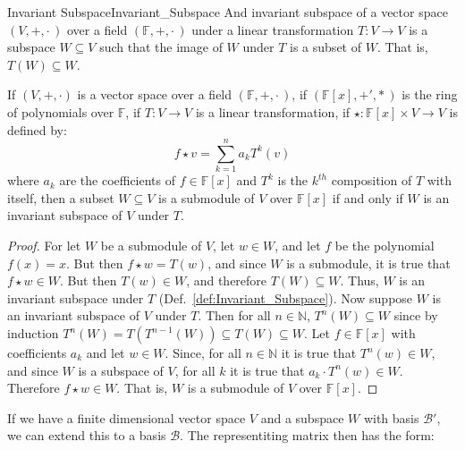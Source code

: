    \begin{fdefinition}{Invariant Subspace}{Invariant_Subspace}
        And invariant subspace of a vector space $(V,\boldsymbol{+},\cdot\,)$
        over a field $(\mathbb{F},+,\cdot\,)$ under a linear transformation
        $T:V\rightarrow{V}$ is a subspace $W\subseteq{V}$ such that the image
        of $W$ under $T$ is a subset of $W$. That is, $T(W)\subseteq{W}$.
    \end{fdefinition}
    \begin{theorem}
        If $(V,\boldsymbol{+},\boldsymbol{\cdot})$ is a vector space over a
        field $(\mathbb{F},+,\cdot\,)$, if $(\mathbb{F}[x],+',*\,)$ is
        the ring of polynomials over $\mathbb{F}$, if $T:V\rightarrow{V}$ is a
        linear transformation, if
        $\star:\mathbb{F}[x]\times{V}\rightarrow{V}$ is defined by:
        \begin{equation}
            f\star{v}=\sum_{k=1}^{n}a_{k}T^{k}(v)
        \end{equation}
        where $a_{k}$ are the coefficients of $f\in\mathbb{F}[x]$ and
        $T^{k}$ is the $k^{th}$ composition of $T$ with itself, then a subset
        $W\subseteq{V}$ is a submodule of $V$ over $\mathbb{F}[x]$ if and only
        if $W$ is an invariant subspace of $V$ under $T$.
    \end{theorem}
    \begin{proof}
        For let $W$ be a submodule of $V$, let $w\in{W}$, and let $f$ be the
        polynomial $f(x)=x$. But then $f\star{w}=T(w)$, and since $W$ is a
        submodule, it is true that $f\star{w}\in{W}$. But then $T(w)\in{W}$,
        and therefore $T(W)\subseteq{W}$. Thus, $W$ is an invariant subspace
        under $T$ (Def.~\ref{def:Invariant_Subspace}). Now suppose $W$ is an
        invariant subspace of $V$ under $T$. Then for all $n\in\mathbb{N}$,
        $T^{n}(W)\subseteq{W}$ since by induction
        $T^{n}(W)=T(T^{n-1}(W))\subseteq{T}(W)\subseteq{W}$. Let
        $f\in\mathbb{F}[x]$ with coefficients $a_{k}$ and let $w\in{W}$. Since,
        for all $n\in\mathbb{N}$ it is true that $T^{n}(w)\in{W}$, and since
        $W$ is a subspace of $V$, for all $k$ it is true that
        $a_{k}\cdot{T}^{n}(w)\in{W}$. Therefore $f\star{w}\in{W}$. That is,
        $W$ is a submodule of $V$ over $\mathbb{F}[x]$.
    \end{proof}
    If we have a finite dimensional vector space $V$ and a subspace $W$ with
    basis $\mathscr{B}'$, we can extend this to a basis $\mathscr{B}$. The
    representiting matrix then has the form:
